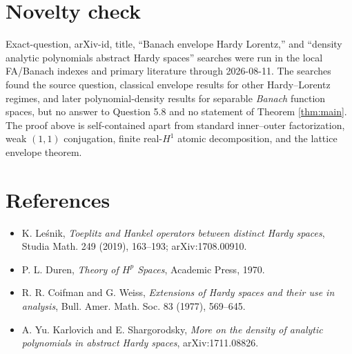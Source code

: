 \documentclass[11pt]{article}
\begin{document}
\section*{Novelty check}

Exact-question, arXiv-id, title, ``Banach envelope Hardy Lorentz,'' and
``density analytic polynomials abstract Hardy spaces'' searches were run
in the local FA/Banach indexes and primary literature through 2026-08-11.
The searches found the source question, classical envelope results for
other Hardy--Lorentz regimes, and later polynomial-density results for
separable \emph{Banach} function spaces, but no answer to Question 5.8 and
no statement of Theorem \ref{thm:main}.  The proof above is self-contained
apart from standard inner--outer factorization, weak $(1,1)$ conjugation,
finite real-$H^1$ atomic decomposition, and the lattice envelope theorem.

\section*{References}

\begin{itemize}
\item K. Le\'snik, \emph{Toeplitz and Hankel operators between distinct
Hardy spaces}, Studia Math. 249 (2019), 163--193; arXiv:1708.00910.
\item P. L. Duren, \emph{Theory of $H^p$ Spaces}, Academic Press, 1970.
\item R. R. Coifman and G. Weiss, \emph{Extensions of Hardy spaces and
their use in analysis}, Bull. Amer. Math. Soc. 83 (1977), 569--645.
\item A. Yu. Karlovich and E. Shargorodsky, \emph{More on the density of
analytic polynomials in abstract Hardy spaces}, arXiv:1711.08826.
\end{itemize}
\end{document}
